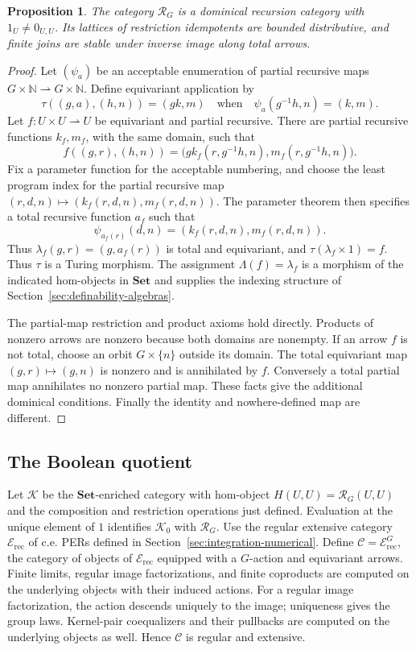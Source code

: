 \documentclass[11pt]{article}
\newtheorem{proposition}[theorem]{Proposition}
\theoremstyle{definition}
\theoremstyle{remark}
\begin{document}
\begin{proposition}\label{prop:equivariant-recursion}
The category $\mathcal R_G$ is a dominical recursion category
with $1_U\ne0_{U,U}$. Its lattices of restriction idempotents are bounded distributive, and finite joins
are stable under inverse image along total arrows.
\end{proposition}
\begin{proof}
Let $(\psi_a)$ be an acceptable enumeration of partial recursive
maps $G\times\mathbb N\rightharpoonup G\times\mathbb N$.
Define equivariant application by
\[
 \tau((g,a),(h,n))=(gk,m)
 \quad\text{when}\quad
 \psi_a(g^{-1}h,n)=(k,m).
\]
Let $f:U\times U\rightharpoonup U$ be equivariant and partial
recursive.  There are partial recursive functions $k_f,m_f$,
with the same domain, such that
\[
 f((g,r),(h,n))
   =\bigl(gk_f(r,g^{-1}h,n),m_f(r,g^{-1}h,n)\bigr).
\]
Fix a parameter function for the acceptable numbering, and
choose the least program index for the partial recursive map
$(r,d,n)\mapsto(k_f(r,d,n),m_f(r,d,n))$.
The parameter theorem \cite[Section~3.4.1]{AspertiLongo}
then specifies a total recursive function $a_f$ such that
\[
 \psi_{a_f(r)}(d,n)=(k_f(r,d,n),m_f(r,d,n)).
\]
Thus $\lambda_f(g,r)=(g,a_f(r))$ is total and equivariant, and
$\tau(\lambda_f\times1)=f$. Thus $\tau$ is a Turing morphism.
The assignment $\Lambda(f)=\lambda_f$ is a morphism of the
indicated hom-objects in $\mathbf{Set}$ and supplies the
indexing structure of Section~\ref{sec:definability-algebras}.

The partial-map restriction and product axioms hold directly.
Products of nonzero arrows are nonzero because both domains
are nonempty.  If an arrow $f$ is not total, choose an orbit
$G\times\{n\}$ outside its domain.  The total equivariant map
$(g,r)\mapsto(g,n)$ is nonzero and is annihilated by $f$.
Conversely a total partial map annihilates no nonzero partial
map.  These facts give the additional dominical conditions.
Finally the identity and nowhere-defined map are different.
\end{proof}

\subsection{The Boolean quotient}

Let $\mathcal K$ be the $\mathbf{Set}$-enriched category with
hom-object $H(U,U)=\mathcal R_G(U,U)$ and the composition and
restriction operations just defined. Evaluation at the unique
element of $1$ identifies $\mathcal K_0$ with $\mathcal R_G$.
Use the regular extensive category $\mathcal E_{\mathrm{rec}}$
of c.e. PERs defined in Section~\ref{sec:integration-numerical}.
Define $\mathcal C=\mathcal E_{\mathrm{rec}}^{G}$,
the category of objects of $\mathcal E_{\mathrm{rec}}$ equipped
with a $G$-action and equivariant arrows. Finite limits, regular
image factorizations, and finite coproducts are computed on the
underlying objects with their induced actions. For a regular
image factorization, the action descends uniquely to the image;
uniqueness gives the group laws. Kernel-pair coequalizers and
their pullbacks are computed on the underlying objects as well.
Hence $\mathcal C$ is regular and extensive.
\end{document}
